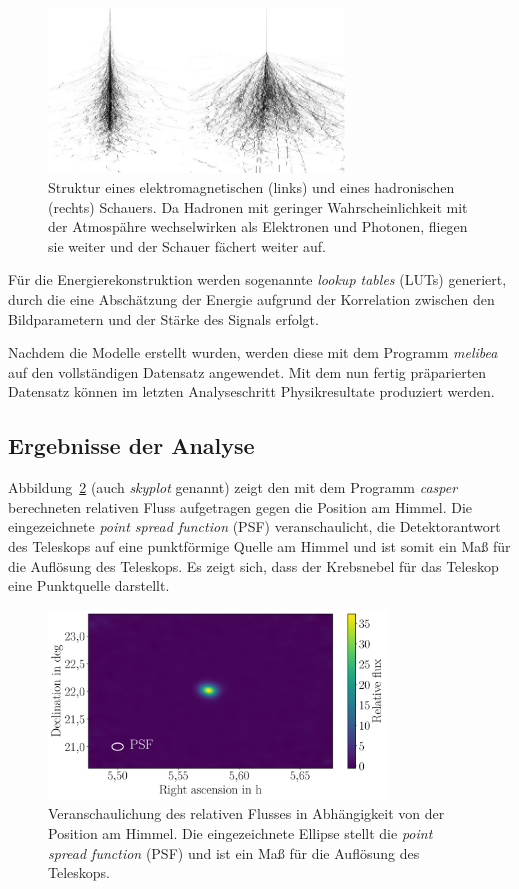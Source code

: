 \begin{figure}
  \centering
  \includegraphics[width=0.7\textwidth]{figures/gamma_hadron.png}
  \caption{Struktur eines elektromagnetischen (links) und eines hadronischen
  (rechts) Schauers. Da Hadronen mit geringer Wahrscheinlichkeit mit der
  Atmospähre wechselwirken als Elektronen und Photonen, fliegen sie weiter und
  der Schauer fächert weiter auf.}
  \label{fig:gamma_hadron}
\end{figure}

Für die Energierekonstruktion werden sogenannte \textit{lookup tables} (LUTs)
generiert, durch die eine Abschätzung der Energie aufgrund der Korrelation
zwischen den Bildparametern und der Stärke des Signals erfolgt.

Nachdem die Modelle erstellt wurden, werden diese mit dem Programm
\textit{melibea} auf den vollständigen Datensatz angewendet. Mit dem nun fertig
präparierten Datensatz können im letzten Analyseschritt Physikresultate
produziert werden.

\subsection{Ergebnisse der Analyse}

Abbildung~\ref{fig:skyplot} (auch \textit{skyplot} genannt) zeigt den mit dem
Programm \textit{casper} berechneten relativen Fluss aufgetragen gegen die
Position am Himmel. Die eingezeichnete \textit{point spread function} (PSF)
veranschaulicht, die Detektorantwort des Teleskops auf eine punktförmige Quelle
am Himmel und ist somit ein Maß für die Auflösung des Teleskops. Es zeigt sich,
dass der Krebsnebel für das Teleskop eine Punktquelle darstellt.

\begin{figure}
  \centering
  \includegraphics[width=0.8\textwidth]{figures/caspar_flux_skymap.pdf}
  \caption{Veranschaulichung des relativen Flusses in Abhängigkeit von der
  Position am Himmel. Die eingezeichnete Ellipse stellt die
  \textit{point spread function} (PSF) und ist ein Maß für die Auflösung des
  Teleskops.}
  \label{fig:skyplot}
\end{figure}

